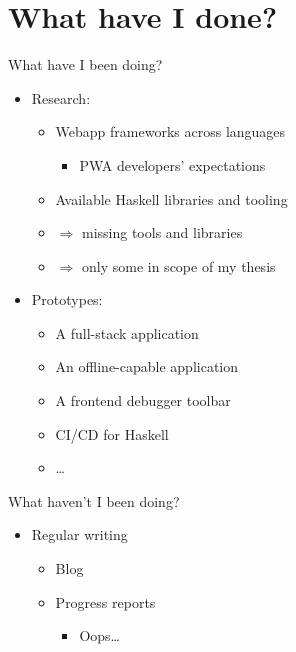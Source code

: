 \documentclass[presentation]{beamer}
\begin{document}
\section{What have I done?}
\label{sec:org9677829}
\begin{frame}[label={sec:orgbca29ce}]{What have I been doing?}
\begin{itemize}
\item Research:
\begin{itemize}
\item Webapp frameworks across languages
\begin{itemize}
\item PWA developers' expectations
\end{itemize}
\item Available Haskell libraries and tooling    \pause
\item \(\Rightarrow\) missing tools and libraries
\item \(\Rightarrow\) only some in scope of my thesis
\end{itemize}
\end{itemize}

\pause

\begin{itemize}
\item Prototypes:
\begin{itemize}
\item A full-stack application
\item An offline-capable application
\item A frontend debugger toolbar
\item CI/CD for Haskell
\item \ldots{}
\end{itemize}
\end{itemize}
\end{frame}

\begin{frame}[label={sec:org560062b}]{What haven't I been doing?}
\pause

\begin{itemize}
\item Regular writing
\begin{itemize}
\item Blog
\item Progress reports   \pause
\begin{itemize}
\item Oops\ldots{}
\end{itemize}
\end{itemize}
\end{itemize}
\end{frame}
\end{document}
